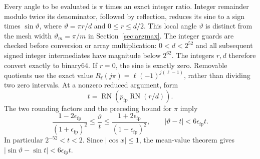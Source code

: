 Every angle to be evaluated is $\pi$ times an exact integer ratio.
Integer remainder modulo twice its denominator, followed by reflection,
reduces its sine to a sign times $\sin\vartheta$, where
$\vartheta=\pi r/d$ and $0\leq r\leq d/2$.
This local angle $\vartheta$ is distinct from the mesh width
$\vartheta_m=\pi/m$ in Section~\ref{sec:argmax}. The integer guards are
checked before conversion or array multiplication: $0<d<2^{52}$ and
all subsequent signed integer intermediates have magnitude below $2^{62}$.
The integers $r,d$ therefore convert exactly to binary64.
If $r=0$, the sine is exactly zero. Removable quotients use the exact
value $R_\ell(j\pi)=\ell(-1)^{j(\ell-1)}$, rather than dividing
two zero intervals. At a nonzero reduced argument, form
\[
 t=\operatorname{RN}\!\left(p_{\mathrm{fp}}
                           \operatorname{RN}(r/d)\right).
\]
The two rounding factors and the preceding bound for $\pi$ imply
\[
 \frac{1-2\epsilon_{\mathrm{fp}}}{(1+\epsilon_{\mathrm{fp}})^2}
 \leq\frac{\vartheta}{t}\leq
 \frac{1+2\epsilon_{\mathrm{fp}}}{(1-\epsilon_{\mathrm{fp}})^2},
 \qquad |\vartheta-t|<6\epsilon_{\mathrm{fp}}t.
\]
In particular $2^{-52}<t<2$. Since $|\cos x|\leq1$, the mean-value
theorem gives $|\sin\vartheta-\sin t|<6\epsilon_{\mathrm{fp}}t$.

